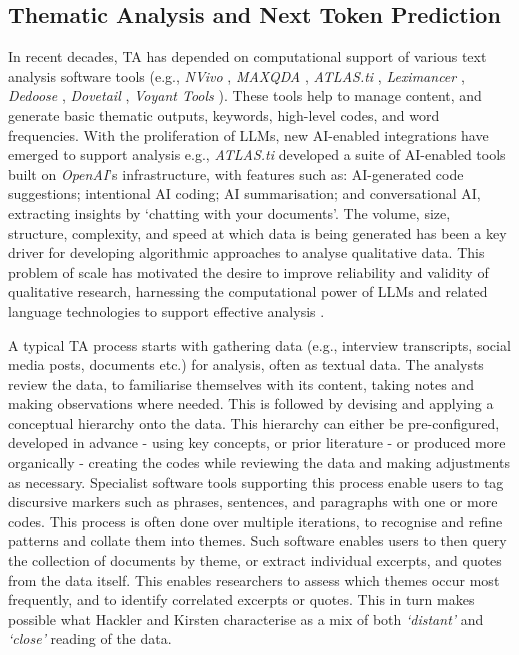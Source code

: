 \documentclass{article}
\begin{document}
\subsection{Thematic Analysis and Next Token Prediction}\label{thematic-analysis-and-next-token-prediction}


In recent decades, TA has depended on computational support of various text analysis software tools (e.g., \emph{NVivo} \cite{nvivoNVivo2024}, \emph{MAXQDA} \cite{maxqdaAllinoneThematicAnalysis2024}, \emph{ATLAS.ti} \cite{atlas.tiATLASTiAI2024}, \emph{Leximancer} \cite{leximancerLeximancer2024}, \emph{Dedoose} \cite{dedooseDedoose2024}, \emph{Dovetail} \cite{dovetailCustomerInsightsHub2024}, \emph{Voyant Tools} \cite{voyanttoolsVoyantTools2024}). These tools help to manage content, and generate basic thematic outputs, keywords, high-level codes, and word frequencies. With the proliferation of LLMs, new AI-enabled integrations have emerged to support analysis e.g., \emph{ATLAS.ti} developed a suite of AI-enabled tools \cite{atlas.tiAccelerateCustomizeYour2024} built on \emph{OpenAI}'s infrastructure, with features such as: AI-generated code suggestions; intentional AI coding; AI summarisation; and conversational AI, extracting insights by `chatting with your documents'. The volume, size, structure, complexity, and speed at which data is being generated has been a key driver for developing algorithmic approaches to analyse qualitative data. This problem of scale has motivated the desire to improve reliability and validity of qualitative research, harnessing the computational power of LLMs and related language technologies to support effective analysis \cite{gaoCoAIcoderExaminingEffectiveness2023, khanbhaiApplyingNaturalLanguage2021}.

A typical TA process starts with gathering data (e.g., interview transcripts, social media posts, documents etc.) for analysis, often as textual data. The analysts review the data, to familiarise themselves with its content, taking notes and making observations where needed. This is followed by devising and applying a conceptual hierarchy onto the data. This hierarchy can either be pre-configured, developed in advance - using key concepts, or prior literature - or produced more organically - creating the codes while reviewing the data and making adjustments as necessary. Specialist software tools supporting this process enable users to tag discursive markers such as phrases, sentences, and paragraphs with one or more codes. This process is often done over multiple iterations, to recognise and refine patterns and collate them into themes. Such software enables users to then query the collection of documents by theme, or extract individual excerpts, and quotes from the data itself. This enables researchers to assess which themes occur most frequently, and to identify correlated excerpts or quotes. This in turn makes possible what Hackler and Kirsten \cite{hacklerDistantReadingComputational2016} characterise as a mix of both \emph{`distant'} and \emph{`close'} reading of the data.
\end{document}

